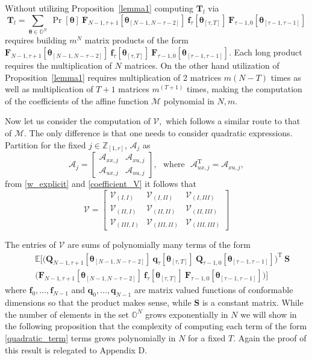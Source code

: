 \documentclass[letterpaper,11pt]{article}
\newcommand{\AR}[2]{\left[\begin{array}{#1}#2\end{array}\right]}
\newcommand{\T}{\mathrm{T}}
\begin{document}
Without utilizing Proposition~\ref{lemma1} computing $\mathbf{T}_l$ via
$$
\mathbf{T}_l = \sum_{\bm{\theta} \in \mathbb{O}^N}~ 	\Pr[\bm{\theta} ]~ 
\mathbf{F}_{N-1, \tau+1}[\bm{\theta}_{[N-1,N-\tau-2]}] ~ \mathbf{f}_{\tau}[\bm{\theta}_{[\tau,T]}] ~ 
\mathbf{F}_{\tau-1, 0}[\bm{\theta}_{[\tau-1,\tau-1]}]
$$
requires building $m^N$ matrix products of the form $\mathbf{F}_{N-1, \tau+1}[\bm{\theta}_{[N-1,N-\tau-2]}] ~ \mathbf{f}_{\tau}[\bm{\theta}_{[\tau,T]}] ~ 
\mathbf{F}_{\tau-1, 0}[\bm{\theta}_{[\tau-1,\tau-1]}]$. 
Each long product requires the multiplication of $N$ matrices. On the other hand utilization of Proposition~\ref{lemma1} requires 
multiplication of 2 matrices $m  (N-T)$ times as well as multiplication of $T+1$ matrices $m^{(T+1)}$ times, making the computation of  the coefficients of the affine function 
$ \mathcal{M}$  polynomial in $N, m$.

Now let us consider the computation of 
$
\mathcal{V},
$ 
which follows a similar route to that of $\mathcal{M} $. The only difference is that 
one needs to consider quadratic expressions. 
Partition for the fixed $j \in \mathbb{Z}_{[1,r]}$, $\mathcal{A}_j$ as 
$$
\mathcal{A}_j = \AR{cc}{\mathcal{A}_{xx,j} &  \mathcal{A}_{xu,j} \\ 
	\mathcal{A}_{ux,j} & \mathcal{A}_{uu,j}},~~~\text{where}~~~ 
\mathcal{A}_{ux,j}^\T = \mathcal{A}_{xu,j},
$$
from \eqref{w_explicit} and \eqref{coefficient_V} it follows that
$$
\mathcal{V} = \AR{lll}{\mathcal{V}_{(I,I)} & \mathcal{V}_{(I,II)} & 
	\mathcal{V}_{(I,III)} \\ 
	\mathcal{V}_{(II,I)} &\mathcal{V}_{(II,II)} & \mathcal{V}_{(II,III)} \\
	\mathcal{V}_{(III,I)} &\mathcal{V}_{(III,II)} & \mathcal{V}_{(III,III)}}
$$

The entries of $\mathcal{V}  $ are sums of polynomially many terms of the form 
\begin{eqnarray}
\label{quadratic_term}
\nonumber
&& \mathbb{E}\bigg[ 
\bigg( \mathbf{Q}_{N-1, \tau+1}[\bm{\theta}_{[N-1,N-\tau-2]}] ~ 
\mathbf{q}_{\tau}[\bm{\theta}_{[\tau,T]}] ~ 
\mathbf{Q}_{\tau-1, 0}[\bm{\theta}_{[\tau-1,\tau-1]}]
\bigg)^\T ~ \mathbf{S} ~\\
&& \bigg( \mathbf{F}_{N-1, \tau+1}[\bm{\theta}_{[N-1,N-\tau-2]}] ~ 
\mathbf{f}_{\tau}[\bm{\theta}_{[\tau,T]}] ~ 
\mathbf{F}_{\tau-1, 0}[\bm{\theta}_{[\tau-1,\tau-1]}]
\bigg) \bigg]
\end{eqnarray}
where $\mathbf{f}_0, \hdots, \mathbf{f}_{N-1}$ and $\mathbf{q}_0, \hdots, \mathbf{q}_{N-1} $ are matrix valued functions of conformable dimensions 
so that the product makes sense, while $\mathbf{S}$ is a constant matrix. 
While the number of elements in the set $ \mathbb{O}^N$ grows exponentially in $N$ 
we will show in the following  proposition that the complexity of computing each term of the form \eqref{quadratic_term}
terms grows polynomially in $N$ for a fixed $T$. Again the proof of this result is relegated to Appendix D.
\end{document}
